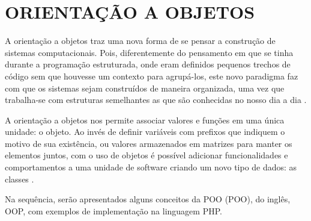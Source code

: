 \section{ORIENTAÇÃO A OBJETOS}

A orientação a objetos traz uma nova forma de se pensar a construção de sistemas
computacionais. Pois, diferentemente do pensamento em que se tinha durante a 
programação estruturada, onde eram definidos pequenos trechos de código sem que 
houvesse um contexto para agrupá-los, este novo paradigma faz com que os sistemas 
sejam construídos de maneira organizada, uma vez que trabalha-se com estruturas 
semelhantes as que são conhecidas no nosso dia a dia
\cite{phpProgramandoComOrientacaoAObjetos}.

A orientação a objetos nos permite associar valores e funções em uma única
unidade: o objeto. Ao invés de definir variáveis com prefixos que indiquem o 
motivo de sua existência, ou valores armazenados em matrizes para manter os 
elementos juntos, com o uso de objetos é possível adicionar funcionalidades e 
comportamentos a uma unidade de software criando um novo tipo de dados: as 
classes \cite{phpMasterWriteCuttingEdgeCode}.

Na sequência, serão apresentados alguns conceitos da \acl{POO} (\acs{POO}), do
inglês, \ac{OOP}, com exemplos de implementação na linguagem \acs{PHP}.













